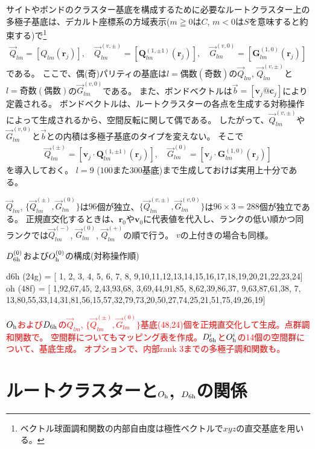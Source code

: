 \documentclass[11pt]{easymemo}
\begin{document}
サイトやボンドのクラスター基底を構成するために必要なルートクラスター上の多極子基底は、デカルト座標系の方域表示($m\geqq 0$は$C$, $m<0$は$S$を意味すると約束する)で\footnote{ベクトル球面調和関数の内部自由度は極性ベクトルで$xyz$の直交基底を用いる。}
\begin{align}
\vec{Q}_{lm}=[Q_{lm}(\bm{r}_j)],
\quad
\vec{Q}_{lm}^{(v,\pm)}=[\bm{Q}_{lm}^{(1,\pm1)}(\bm{r}_j)],
\quad
\vec{G}_{lm}^{(v,0)}=[\bm{G}_{lm}^{(1,0)}(\bm{r}_j)]
\end{align}
である。
ここで、偶(奇)パリティの基底は$l=偶数(奇数)$の$\vec{Q}_{lm}$, $\vec{Q}_{lm}^{(v,\pm)}$と$l=奇数(偶数)$の$\vec{G}_{lm}^{(v,0)}$である。
また、ボンドベクトルは$\vec{b}=[\bm{v}_j@\bm{c}_j]$により定義される。
ボンドベクトルは、ルートクラスターの各点を生成する対称操作によって生成されるから、空間反転に関して偶である。
したがって、$\vec{Q}_{lm}^{(v,\pm)}$や$\vec{G}_{lm}^{(v,0)}$と$\vec{b}$との内積は多極子基底のタイプを変えない。
そこで
\begin{align}
\vec{Q}_{lm}^{(\pm)}=[\bm{v}_j\cdot\bm{Q}_{lm}^{(1,\pm1)}(\bm{r}_j)],
\quad
\vec{G}_{lm}^{(0)}=[\bm{v}_j\cdot\bm{G}_{lm}^{(1,0)}(\bm{r}_j)]
\end{align}
を導入しておく。
$l=9$ ($100$また$300$基底)まで生成しておけば実用上十分である。

$\vec{Q}_{lm}$, $\{\vec{Q}_{lm}^{(\pm)},\vec{G}_{lm}^{(0)}\}$は$96$個が独立、$\{\vec{Q}_{lm}^{(v,\pm)},\vec{G}_{lm}^{(v,0)}\}$は$96\times 3=288$個が独立である。
正規直交化するときは、$\bm{r}_0$や$\bm{v}_0$に代表値を代入し、ランクの低い順かつ同ランクでは$\vec{Q}_{lm}^{(-)}$, $\vec{G}_{lm}^{(0)}$, $\vec{Q}_{lm}^{(+)}$の順で行う。
$v$の上付きの場合も同様。

$D_{\rm 6h}^{(0)}$および$O_{\rm h}^{(0)}$の構成(対称操作順)
\begin{codebox}
d6h (24g) =
[ 1, 2, 3, 4, 5, 6, 7, 8, 9,10,11,12,13,14,15,16,17,18,19,20,21,22,23,24]
oh (48f) =
[ 1,92,67,45, 2,43,93,68, 3,69,44,91,85, 8,62,39,86,37, 9,63,87,61,38, 7,
 13,80,55,33,14,31,81,56,15,57,32,79,73,20,50,27,74,25,21,51,75,49,26,19]
\end{codebox}

\textcolor{red}{
$O_{\rm h}$および$D_{\rm 6h}$の$\vec{Q}_{lm}$, $\{\vec{Q}_{lm}^{(\pm)},\vec{G}_{lm}^{(0)}\}$基底(48,24)個を正規直交化して生成。点群調和関数で。
空間群についてもマッピング表を作成。$D_{\rm 6h}^i$と$O_{\rm h}^i$の14個の空間群について、基底生成。
オプションで、内部rank 3までの多極子調和関数も。
}



\section{ルートクラスターと$O_{\rm h}$, $D_{\rm 6h}$の関係}
\end{document}

